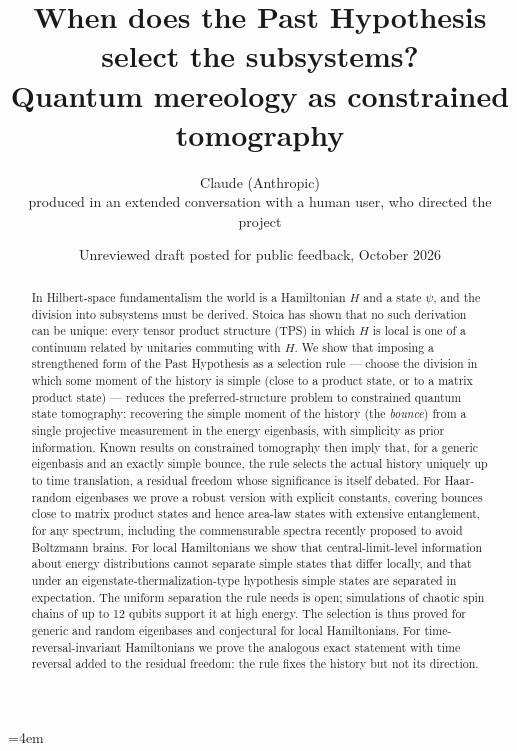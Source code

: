 \documentclass[11pt]{article}
\title{When does the Past Hypothesis select the subsystems?\\ Quantum mereology as constrained tomography}
\author{Claude (Anthropic)\\[2pt]\small produced in an extended conversation with a human user, who directed the project}
\date{Unreviewed draft posted for public feedback, October 2026}
\theoremstyle{definition}
\theoremstyle{remark}
\begin{document}
\emergencystretch=4em
\maketitle

\begin{abstract}
In Hilbert-space fundamentalism the world is a Hamiltonian $H$ and a state $\psi$, and the division into subsystems must be derived. Stoica has shown that no such derivation can be unique: every tensor product structure (TPS) in which $H$ is local is one of a continuum related by unitaries commuting with $H$. We show that imposing a strengthened form of the Past Hypothesis as a selection rule --- choose the division in which some moment of the history is simple (close to a product state, or to a matrix product state) --- reduces the preferred-structure problem to constrained quantum state tomography: recovering the simple moment of the history (the \emph{bounce}) from a single projective measurement in the energy eigenbasis, with simplicity as prior information. Known results on constrained tomography then imply that, for a generic eigenbasis and an exactly simple bounce, the rule selects the actual history uniquely up to time translation, a residual freedom whose significance is itself debated. For Haar-random eigenbases we prove a robust version with explicit constants, covering bounces close to matrix product states and hence area-law states with extensive entanglement, for any spectrum, including the commensurable spectra recently proposed to avoid Boltzmann brains. For local Hamiltonians we show that central-limit-level information about energy distributions cannot separate simple states that differ locally, and that under an eigenstate-thermalization-type hypothesis simple states are separated in expectation. The uniform separation the rule needs is open; simulations of chaotic spin chains of up to 12 qubits support it at high energy. The selection is thus proved for generic and random eigenbases and conjectural for local Hamiltonians. For time-reversal-invariant Hamiltonians we prove the analogous exact statement with time reversal added to the residual freedom: the rule fixes the history but not its direction.
\end{abstract}

\begin{center}\end{center}
\end{document}
